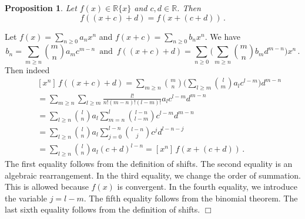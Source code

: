 \documentclass[10pt]{article}
\def\R{\mathbb{R}}
\def\proof{\par\noindent{\em Proof. }}
\def\eproof{\hfill{$\Box$}\bigskip}
\newtheorem{prop}[thm]{Proposition}
\begin{document}
\begin{prop}\label{prop_repeAdd}
Let $f(x)\in\R\{x\}$ and $c,d\in\R$. Then 
$$
f((x+c)+d)=f(x+(c+d))\,.
$$
    
\end{prop}
\proof
Let $f(x)=\sum_{n\ge0}a_nx^n$ and $f(x+c)=\sum_{n\ge0}b_nx^n$. We have 
$${\textstyle
b_n=\sum_{m\ge n}\binom{m}{n}a_m
c^{m-n}\,\text{ and }\,f((x+c)+d)=\sum_{n\ge0}\big(\sum_{m\ge n}\binom{m}{n}b_md^{m-n}\big)x^n\,.
}
$$
Then indeed
\begin{eqnarray*}
&&{\textstyle
[x^n]\,f((x+c)+d)=
\sum_{m\ge n}\binom{m}{n}\big(\sum_{l\ge m}\binom{l}{m}a_lc^{l-m}\big)d^{m-n}}\\  
&&={\textstyle
\sum_{m\ge n}\sum_{l\ge m}\frac{l!}{n!(m-n)!(l-m)!}a_lc^{l-m}d^{m-n}}\\
&&{\textstyle
=\sum_{l\ge n}\binom{l}{n}a_l\sum_{m=n}^l\binom{l-n}{l-m}c^{l-m}d^{m-n}}\\
&&{\textstyle
=\sum_{l\ge n}\binom{l}{n}a_l\sum_{j=0}^{l-n}\binom{l-n}{j}c^jd^{l-n-j}
}\\
&&{\textstyle=\sum_{l\ge n}\binom{l}{n}a_l(c+d)^{l-n}=[x^n]\,f(x+(c+d))\,.}
\end{eqnarray*}
The first equality follows from the definition of shifts. The second 
equality is an algebraic rearrangement. In the third 
equality, we change the order of summation. This is allowed because 
$f(x)$ is convergent. 
In the fourth 
equality, we introduce the variable $j=l-m$. The fifth equality follows 
from the binomial theorem. The last sixth equality follows from the 
definition of shifts.
\eproof
\end{document}
